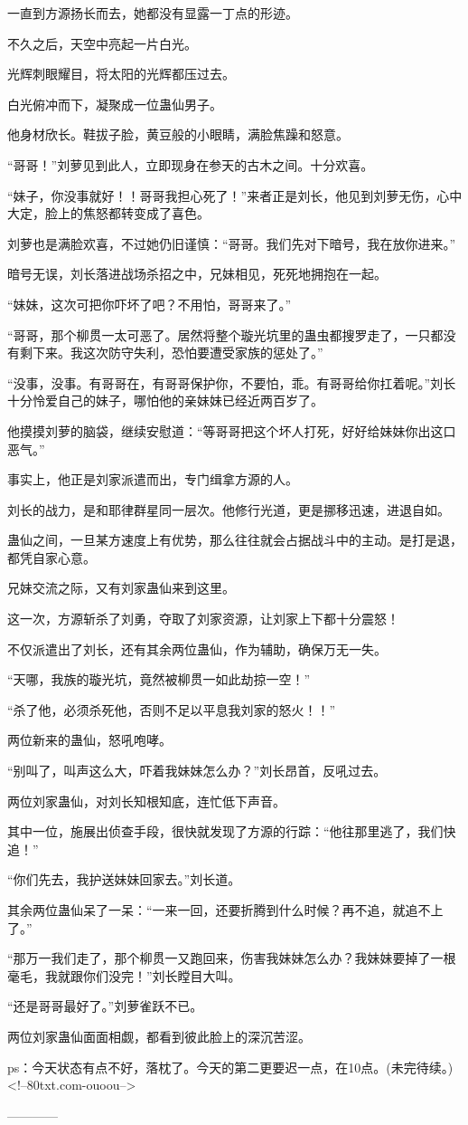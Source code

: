 \begin{this_body}
一直到方源扬长而去，她都没有显露一丁点的形迹。

不久之后，天空中亮起一片白光。

光辉刺眼耀目，将太阳的光辉都压过去。

白光俯冲而下，凝聚成一位蛊仙男子。

他身材欣长。鞋拔子脸，黄豆般的小眼睛，满脸焦躁和怒意。

“哥哥！”刘萝见到此人，立即现身在参天的古木之间。十分欢喜。

“妹子，你没事就好！！哥哥我担心死了！”来者正是刘长，他见到刘萝无伤，心中大定，脸上的焦怒都转变成了喜色。

刘萝也是满脸欢喜，不过她仍旧谨慎：“哥哥。我们先对下暗号，我在放你进来。”

暗号无误，刘长落进战场杀招之中，兄妹相见，死死地拥抱在一起。

“妹妹，这次可把你吓坏了吧？不用怕，哥哥来了。”

“哥哥，那个柳贯一太可恶了。居然将整个璇光坑里的蛊虫都搜罗走了，一只都没有剩下来。我这次防守失利，恐怕要遭受家族的惩处了。”

“没事，没事。有哥哥在，有哥哥保护你，不要怕，乖。有哥哥给你扛着呢。”刘长十分怜爱自己的妹子，哪怕他的亲妹妹已经近两百岁了。

他摸摸刘萝的脑袋，继续安慰道：“等哥哥把这个坏人打死，好好给妹妹你出这口恶气。”

事实上，他正是刘家派遣而出，专门缉拿方源的人。

刘长的战力，是和耶律群星同一层次。他修行光道，更是挪移迅速，进退自如。

蛊仙之间，一旦某方速度上有优势，那么往往就会占据战斗中的主动。是打是退，都凭自家心意。

兄妹交流之际，又有刘家蛊仙来到这里。

这一次，方源斩杀了刘勇，夺取了刘家资源，让刘家上下都十分震怒！

不仅派遣出了刘长，还有其余两位蛊仙，作为辅助，确保万无一失。

“天哪，我族的璇光坑，竟然被柳贯一如此劫掠一空！”

“杀了他，必须杀死他，否则不足以平息我刘家的怒火！！”

两位新来的蛊仙，怒吼咆哮。

“别叫了，叫声这么大，吓着我妹妹怎么办？”刘长昂首，反吼过去。

两位刘家蛊仙，对刘长知根知底，连忙低下声音。

其中一位，施展出侦查手段，很快就发现了方源的行踪：“他往那里逃了，我们快追！”

“你们先去，我护送妹妹回家去。”刘长道。

其余两位蛊仙呆了一呆：“一来一回，还要折腾到什么时候？再不追，就追不上了。”

“那万一我们走了，那个柳贯一又跑回来，伤害我妹妹怎么办？我妹妹要掉了一根毫毛，我就跟你们没完！”刘长瞠目大叫。

“还是哥哥最好了。”刘萝雀跃不已。

两位刘家蛊仙面面相觑，都看到彼此脸上的深沉苦涩。

ps：今天状态有点不好，落枕了。今天的第二更要迟一点，在10点。(未完待续。)<!--80txt.com-ouoou-->

------------

\end{this_body}

